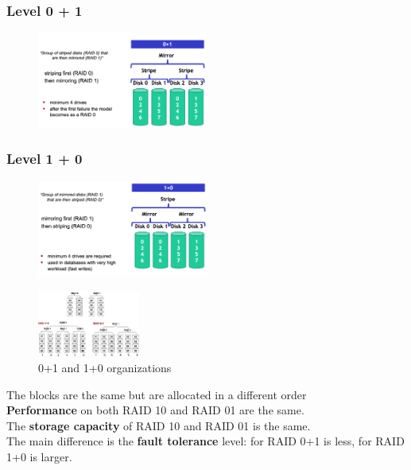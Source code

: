 \documentclass[10pt, oneside]{article}
\begin{document}
\begin{multicols}{2}
    \subsubsection{Level 0 + 1}
    \begin{figure}[H]
        \begin{center}
        \includegraphics[width=0.5\textwidth]{img/img69.png}
        \end{center}
    \end{figure}
    \columnbreak
    \subsubsection{Level 1 + 0}
    \begin{figure}[H]
        \begin{center}
        \includegraphics[width=0.5\textwidth]{img/img70.png}
        \end{center}
    \end{figure}
\end{multicols}
\begin{multicols}{2}
    \begin{figure}[H]
        \begin{center}
        \includegraphics[width=0.3\textwidth]{img/img71.png}
        \caption{0+1 and 1+0 organizations}
        \end{center}
    \end{figure}\columnbreak
    The blocks are the same but are allocated in a different order\\{\bf Performance} on both RAID 10 and RAID 01 are the same.\\The {\bf storage capacity} of RAID 10 and RAID 01 is the same.\\The main difference is the {\bf fault tolerance} level: for RAID 0+1 is less, for RAID 1+0 is larger.
\end{multicols}
\end{document}
